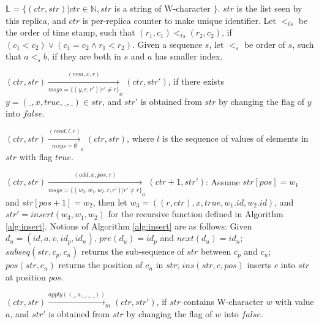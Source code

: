 \begin{itemize}
\setlength{\itemsep}{0.5pt}
\item[-] $\mathbb{L} = \{ (\mathit{ctr}, \mathit{str}) \vert \mathit{ctr} \in \mathbb{N}, \mathit{str}$ is a string of W-character $\}$. $\mathit{str}$ is the list seen by this replica, and $\mathit{ctr}$ is per-replica counter to make unique identifier. Let $<_{\mathit{ts}}$ be the order of time stamp, such that $(r_1,c_1) <_{\mathit{ts}} (r_2,c_2)$, if $(c_1 < c_2) \vee (c_1 = c_2 \wedge r_1 < r_2)$. Given a sequence $s$, let $<_s$ be order of $s$, such that $a <_s b$, if they are both in $s$ and $a$ has smaller index. 

{\color {red}
\item[-] $(\mathit{ctr},\mathit{str}) \xrightarrow[\mathit{msgs} = \{ (y,r,r') \vert r' \neq r \}]{(\mathit{rem},x,r)}_o (\mathit{ctr},\mathit{str}')$, if there exists $y = (\_,x,\textit{true},\_,\_) \in \mathit{str}$, and $\mathit{str}'$ is obtained from $\mathit{str}$ by changing the flag of $y$ into $\mathit{false}$. 

\item[-] $(\mathit{ctr},\mathit{str}) \xrightarrow[\mathit{msgs} = \emptyset]{(\mathit{read},l,r)}_o (\mathit{ctr},\mathit{str})$, where $l$ is the sequence of values of elements in $\mathit{str}$ with flag $\mathit{true}$. 

\item[-] $(\mathit{ctr},\mathit{str}) \xrightarrow[\mathit{msgs} = \{ (w_3,w_1,w_2,r,r') \vert r' \neq r \}]{(\mathit{add},x,\mathit{pos},r)}_o (\mathit{ctr}+1,\mathit{str}')$: Assume $\mathit{str}[\mathit{pos}]=w_1$ and $\mathit{str}[\mathit{pos}+1]=w_2$, then let $w_3 = ((r,\mathit{ctr}),x,\mathit{true},w_1.\mathit{id},w_2.\mathit{id})$, and $\mathit{str}' = \mathit{insert}(w_3,w_1,w_2)$ for the recursive function defined in Algorithm \ref{alg:insert}. Notions of Algorithm \ref{alg:insert} are as follows: Given $d_u = (\mathit{id},a,v,\mathit{id}_p,\mathit{id}_n)$, $\mathit{pre}(d_u) = \mathit{id}_p$ and $\mathit{next}(d_u)=\mathit{id}_n$; $\mathit{subseq}(\mathit{str},c_p,c_n)$ returns the sub-sequence of $\mathit{str}$ between $c_p$ and $c_n$; $\mathit{pos}(\mathit{str},c_n)$ returns the position of $c_n$ in $\mathit{str}$; $\mathit{ins}(\mathit{str},c,\mathit{pos})$ inserts $c$ into $\mathit{str}$ at position $\mathit{pos}$. 

\item[-] $(\mathit{ctr},\mathit{str}) \xrightarrow{\mathit{apply}((\_,a,\_,\_,\_))}_m (\mathit{ctr},\mathit{str}')$, if $\mathit{str}$ contains W-character $w$ with value $a$, and $\mathit{str}'$ is obtained from $\mathit{str}$ by changing the flag of $w$ into $\mathit{false}$. 

}
\end{itemize}
